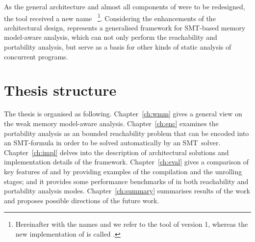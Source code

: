 As the general architecture and almost all components of \porthos{} were to be redesigned, the tool received a new name \textit{\porthos[2]}\,%
%
\footnote{Hereinafter with the names \textit{\porthos{}} and \textit{\porthos[1]} we refer to the tool \porthos{} of version 1, whereas the new implementation of \porthos{} is called \textit{\porthos[2]}.}. %
%
Considering the enhancements of the architectural design, \porthos[2] represents a generalised framework for SMT-based memory model-aware analysis, which can not only perform the reachability and portability analysis, but serve as a basis for other kinds of static analysis of concurrent programs.


\section{Thesis structure}
\label{ch:intro:structure}

The thesis is organised as following.
Chapter~\ref{ch:wmm} gives a general view on the weak memory model-aware analysis.
Chapter~\ref{ch:enc} examines the portability analysis as an bounded reachability problem that can be encoded into an SMT-formula in order to be solved automatically by an SMT~solver.
Chapter~\ref{ch:impl} delves into the description of architectural solutions and implementation details of the \porthos[2] framework.
Chapter~\ref{ch:eval} gives a comparison of key features of \porthos[2] and \porthos[1] by providing examples of the compilation and the unrolling stages; and it provides some performance benchmarks of \porthos[2] in both reachability and portability analysis modes.
Chapter~\ref{ch:summary} summarises results of the work and proposes possible directions of the future work.
